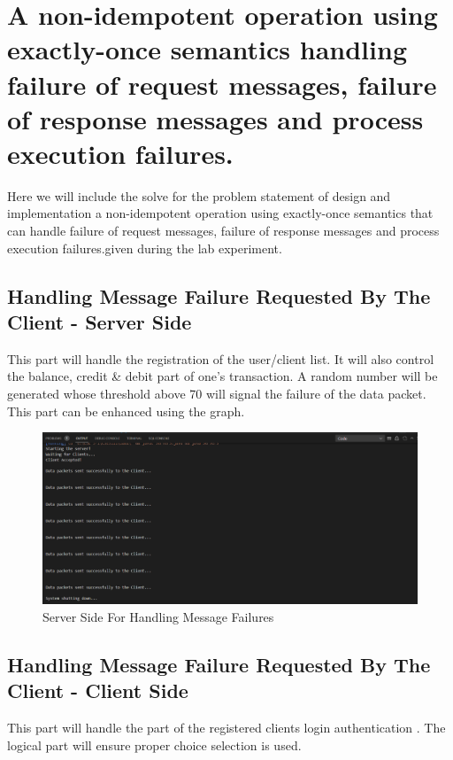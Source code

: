 \documentclass[11pt]{article}
\begin{document}
\section{A non-idempotent operation using exactly-once semantics handling failure of request messages, failure of response messages and process execution failures.}
Here we will include the solve for the problem statement of design and implementation a non-idempotent operation using exactly-once semantics that can handle failure of request messages, failure of response messages and process execution failures.given during the lab experiment.
\subsection{Handling Message Failure  Requested By The Client - Server Side }
This part will handle the registration of the user/client list. It will also control the balance, credit & debit part of one's transaction. A random number will be generated whose threshold above 70 will signal the failure of the data packet. This part can be enhanced using the graph. 


\begin{figure}[!h]
\centering
\includegraphics[width=\textwidth]{message_server.png}
\caption{Server Side For Handling Message Failures}
\end{figure}


\subsection{Handling Message Failure Requested By The Client - Client Side}
This part will handle the part of the registered clients login authentication . The logical part will ensure proper choice selection is used.

\end{document}
